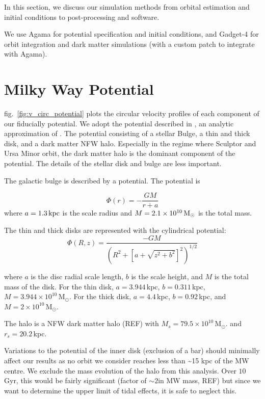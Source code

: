 In this section, we discuss our simulation methods from orbital
estimation and initial conditions to post-processing and software.

We use Agama \citep{agama} for potential specification and initial
conditions, and Gadget-4 \citep{gadget4} for orbit integration and dark
matter simulations (with a custom patch to integrate with Agama).

\section{Milky Way Potential}\label{milky-way-potential}

fig.~\ref{fig:v_circ_potential} plots the circular velocity profiles of
each component of our fiducially potential. We adopt the potential
described in \citet{EP2020}, an analytic approximation of
\citet{mcmillan2011}. The potential consisting of a stellar Bulge, a
thin and thick disk, and a dark matter NFW halo. Especially in the
regime where Sculptor and Ursa Minor orbit, the dark matter halo is the
dominant component of the potential. The details of the stellar disk and
bulge are less important.

The galactic bulge is described by a \citet{hernquist1990} potential.
The potential is

\[
\Phi(r) = - \frac{GM}{r + a}
\] where \(a=1.3\,{\rm kpc}\) is the scale radius and
\(M=2.1 \times 10^{10}\,{\rm M}_{\odot}\) is the total mass.

The thin and thick disks are represented with the
\citet{miyamoto+nagai1975} cylindrical potential: \[
\Phi(R, z) = \frac{-GM}{\left(R^2 + \left[a + \sqrt{z^2 + b^2}\right]^{2}\right)^{1/2}}
\]

where \(a\) is the disc radial scale length, \(b\) is the scale height,
and \(M\) is the total mass of the disk. For the thin disk,
\(a=3.944\,\)kpc, \(b=0.311\,\)kpc,
\(M=3.944\times10^{10}\,\)M\(_\odot\). For the thick disk,
\(a=4.4\,\)kpc, \(b=0.92\,\)kpc, and \(M=2\times10^{10}\,\)M\(_\odot\).

The halo is a NFW dark matter halo (REF) with
\(M_s=79.5\times10^{10}\,\)M\(_\odot\). and \(r_s = 20.2\,\)kpc.

Variations to the potential of the inner disk (exclusion of a bar)
should minimally affect our results as no orbit we consider reaches less
than \textasciitilde15 kpc of the MW centre. We exclude the mass
evolution of the halo from this analysis. Over \(10\,\)Gyr, this would
be fairly significant (factor of \(\sim 2\)in MW mass, REF) but since we
want to determine the upper limit of tidal effects, it is safe to
neglect this.

